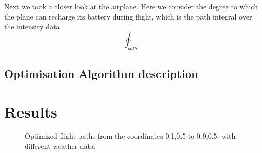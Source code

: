 \documentclass[ twoside,openright,titlepage,numbers=noenddot,headinclude,%
                footinclude=true,cleardoublepage=empty,abstractoff, %
                BCOR=5mm,paper=a4,fontsize=11pt,%
                ngerman,american,%
                ]{scrreprt}
\begin{document}
Next we took a closer look at the airplane. Here we consider the degree to which the plane can recharge its battery during flight, which is the path integral over the intensity data:
\begin{equation}
\oint_{path}
\end{equation} 


\section{Optimisation Algorithm description}

\chapter{Results}
\begin{figure}


\caption{Optimized flight paths from the coordinates 0.1,0.5 to 0.9,0.5, with different weather data.}
\end{figure}
\end{document}
